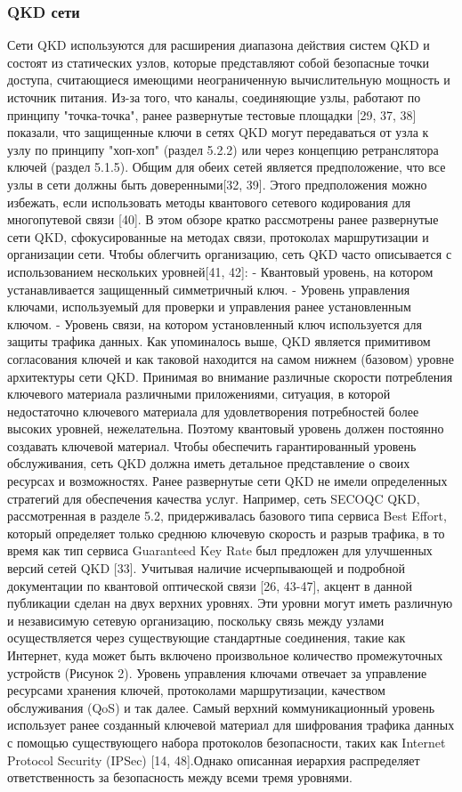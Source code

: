 \subsubsection{QKD сети}
Сети QKD используются для расширения диапазона действия систем QKD и состоят из статических узлов, которые представляют собой безопасные точки доступа, считающиеся имеющими неограниченную вычислительную мощность и источник питания. Из-за того, что каналы, соединяющие узлы, работают по принципу "точка-точка", ранее развернутые тестовые площадки [29, 37, 38] показали, что защищенные ключи в сетях QKD могут передаваться от узла к узлу по принципу "хоп-хоп" (раздел 5.2.2) или через концепцию ретранслятора ключей (раздел 5.1.5).
Общим для обеих сетей является предположение, что все узлы в сети должны быть доверенными[32, 39]. Этого предположения можно избежать, если использовать методы квантового сетевого кодирования для многопутевой связи [40]. В этом обзоре кратко рассмотрены ранее развернутые сети QKD, сфокусированные на методах связи, протоколах маршрутизации и организации сети.
Чтобы облегчить организацию, сеть QKD часто описывается с использованием нескольких уровней[41, 42]:
- Квантовый уровень, на котором устанавливается защищенный симметричный ключ.
- Уровень управления ключами, используемый для проверки и управления ранее установленным ключом.
- Уровень связи, на котором установленный ключ используется для защиты трафика данных.
Как упоминалось выше, QKD является примитивом согласования ключей и как таковой находится на самом нижнем (базовом) уровне архитектуры сети QKD. Принимая во внимание различные скорости потребления ключевого материала различными приложениями, ситуация, в которой недостаточно ключевого материала для удовлетворения потребностей более высоких уровней, нежелательна. Поэтому квантовый уровень должен постоянно создавать ключевой материал. Чтобы обеспечить гарантированный уровень обслуживания, сеть QKD должна иметь детальное представление о своих ресурсах и возможностях. Ранее развернутые сети QKD не имели определенных стратегий для обеспечения качества услуг. Например, сеть SECOQC QKD, рассмотренная в разделе 5.2, придерживалась базового типа сервиса Best Effort, который определяет только среднюю ключевую скорость и разрыв трафика, в то время как тип сервиса Guaranteed Key Rate был предложен для улучшенных версий сетей QKD [33].
Учитывая наличие исчерпывающей и подробной документации по квантовой оптической связи [26, 43-47], акцент в данной публикации сделан на двух верхних уровнях. Эти уровни могут иметь различную и независимую сетевую организацию, поскольку связь между узлами осуществляется через существующие стандартные соединения, такие как Интернет, куда может быть включено произвольное количество промежуточных устройств (Рисунок 2). Уровень управления ключами отвечает за управление ресурсами хранения ключей, протоколами маршрутизации, качеством обслуживания (QoS) и так далее. Самый верхний коммуникационный уровень использует ранее созданный ключевой материал для шифрования трафика данных с помощью существующего набора протоколов безопасности, таких как Internet Protocol Security (IPSec) [14, 48].Однако описанная иерархия распределяет ответственность за безопасность между всеми тремя уровнями.
